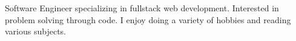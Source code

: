

\begin{cvparagraph}

Software Engineer specializing in fullstack web development. Interested in problem solving through code. I enjoy doing a variety of hobbies and reading various subjects.

\end{cvparagraph}
